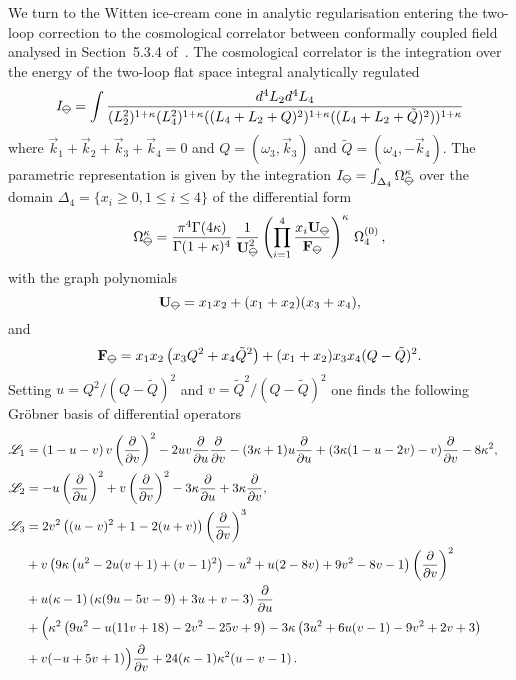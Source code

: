 \documentclass[a4paper,12pt]{article}
\numberwithin{equation}{section}
\numberwithin{figure}{section}
\newcommand{\IceCream}{	\begin{tikzpicture}[scale=0.05]
	\draw[color = black, fill=none] (2,0) arc(0:180:2);
		\draw [black] (-2,0) to (2,0);
		\draw [black] (-2,0) to (0,-2);
                	\draw [black] (2,0) to (0,-2);
	\end{tikzpicture}}
\begin{document}
We turn to the Witten ice-cream cone in analytic regularisation
entering the two-loop correction to the cosmological correlator
between conformally coupled field analysed in Section~5.3.4 of~\cite{Chowdhury:2023arc}.
The cosmological correlator is the integration over the energy of the
two-loop flat space integral analytically regulated
\begin{equation}
  I_{\IceCream}= \int \frac{d^{4}L_{2}d^{4}L_{4}}{(L_2^2)^{1+\kappa}(L_4^2)^{1+\kappa}((L_4+L_2+Q)^2)^{1+\kappa}((L_4+L_2+\tilde Q)^2))^{1+\kappa} }  
\end{equation}
where $\vec k_1+\vec k_2+\vec k_3+\vec k_4=0$ and $Q=(\omega_3,\vec
k_3)$ and $\tilde Q=(\omega_4,-\vec k_4)$.
The parametric representation is given by the integration 
$
  I_{\IceCream} = \int_{\Delta_4} \Omega_{\IceCream}^\kappa
$
over the domain $\Delta_4=\{x_i\geq0,1\leq i\leq 4\}$ of the
differential form
\begin{equation}
  \Omega_{\IceCream}^\kappa= {\pi^4\Gamma(4\kappa)\over
    \Gamma(1+\kappa)^4} \,{1\over \textbf{U}_{\IceCream}^{2} }
  \left(\prod_{i=1}^4 {x_i\textbf{U}_{\IceCream}\over \textbf{F}_{\IceCream}}  \right)^\kappa\,\Omega_4^{(0)}\,,
\end{equation}
with the graph polynomials
\begin{equation}
    \textbf{U}_{\IceCream}=x_1x_2+(x_1+x_2)(x_3+x_4),
  \end{equation}
  and
  \begin{equation}
    \textbf{F}_{\IceCream}=x_1x_2\left(x_3 Q^2+x_4 \tilde
      Q^2\right)+(x_1+x_2)x_3x_4 (Q-\tilde Q)^2.
  \end{equation}
  Setting  $u= Q^2/(Q-\tilde Q)^2$ and $v=\tilde Q^2/(Q-\tilde Q)^2$
  one finds the following Gr\"obner basis of differential operators
  \begin{align}
  \mathscr{L}_1&=\left(1-u
   -v\right) v\left(\partial\over\partial v\right)^{2} -2u
                 v{\partial\over\partial u}{\partial\over\partial
                 v}-(3 \kappa+1)u {\partial\over\partial u}+(3 \kappa
                 (1-  u-2  v)-v){\partial\over\partial v}-8 \kappa ^2,\cr
  \mathscr{L}_2&=     -u\left(\partial\over\partial u\right)^{2}    +v\left(\partial\over\partial v\right)^{2}       -3 \kappa
   {\partial\over\partial u}+3 \kappa
                 {\partial\over\partial v},\cr
 \mathscr{L}_3&=       2v^2 \left((u-v)^2+1-2(u+v)\right) \left(\partial\over
                \partial v\right)^3\cr
                &+v\left(9 \kappa  \left(u^2-2 u
                (v+1)+(v-1)^2\right)-u^2+u (2-8 v)+9 v^2-8
                v-1\right)\left(\partial\over\partial
                  v\right)^2\cr
                  &+u(\kappa-1)\left(\kappa  (9 u-5 v-9)+3
                    u+v-3\right){\partial\over\partial u}\cr
                    &+\Big(\kappa ^2 \left(9 u^2-u (11 v+18)-2 v^2-25 v+9\right)-3 \kappa  \left(3 u^2+6 u (v-1)-9
                      v^2+2 v+3\right)\cr
                      &+v (-u+5 v+1)\Big){\partial\over\partial v}+24 (\kappa -1) \kappa ^2 (u-v-1)\,.
  \end{align}
\end{document}
